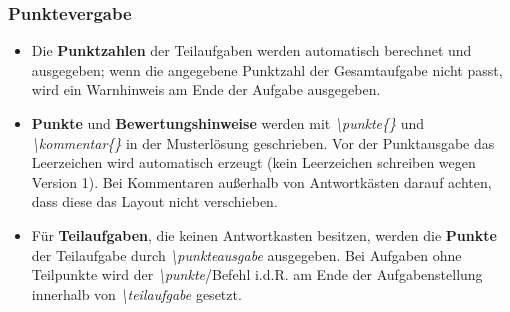 \documentclass[../main.tex]{subfiles}
\begin{document}
\subsubsection{Punktevergabe}
\begin{itemize}
    \item Die \textbf{Punktzahlen} der Teilaufgaben werden automatisch berechnet und ausgegeben; wenn die angegebene Punktzahl der Gesamtaufgabe nicht passt, wird ein Warnhinweis am Ende der Aufgabe ausgegeben.
    \item \textbf{Punkte} und \textbf{Bewertungshinweise} werden mit \hypertarget{punkte}{\textit{\textbackslash punkte\{\}}} und \hypertarget{kommentar}{\textit{\textbackslash kommentar\{\}}} in der Musterl\"osung geschrieben. Vor der Punktausgabe das Leerzeichen wird automatisch erzeugt (kein Leerzeichen schreiben wegen Version 1). Bei Kommentaren au\ss{}erhalb von Antwortk\"asten darauf achten, dass diese das Layout nicht verschieben.
    \item F\"ur \textbf{Teilaufgaben}, die keinen Antwortkasten besitzen, werden die \textbf{Punkte} der Teilaufgabe durch \hypertarget{punkteausgabe}{\textit{\textbackslash punkteausgabe}} ausgegeben. Bei Aufgaben ohne Teilpunkte wird der \textit{\textbackslash punkte}\-/Befehl i.d.R. am Ende der Aufgabenstellung innerhalb von \textit{\textbackslash teilaufgabe} gesetzt.
\end{itemize}
\end{document}
